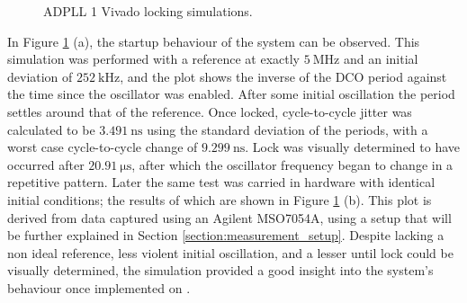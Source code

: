 \begin{figure}[h]
    \centering
    \caption[\ac{ADPLL} 1 Vivado locking simulations]{\ac{ADPLL} 1 Vivado locking simulations.}
    \label{fig:sim_locking}
\end{figure}
In Figure \ref{fig:sim_locking} (a), the startup behaviour of the system can be observed. This simulation was performed with a reference at exactly $5~\si{\mega\hertz}$ and an initial deviation of $252~\si{\kilo\hertz}$, and the plot shows the inverse of the \ac{DCO} period against the time since the oscillator was enabled. After some initial oscillation the period settles around that of the reference. Once locked, cycle-to-cycle jitter was calculated to be $3.491~\si{\nano\second}$ using the standard deviation of the periods, with a worst case cycle-to-cycle change of $9.299~\si{\nano\second}$. Lock was visually determined to have occurred after $20.91~\si{\micro\second}$, after which the oscillator frequency began to change in a repetitive pattern. Later the same test was carried in hardware with identical initial conditions; the results of which are shown in Figure \ref{fig:sim_locking} (b). This plot is derived from data captured using an Agilent MSO7054A, using a setup that will be further explained in Section \ref{section:measurement_setup}. Despite lacking a non ideal reference, less violent initial oscillation, and a lesser until lock could be visually determined, the simulation provided a good insight into the system's behaviour once implemented on .



